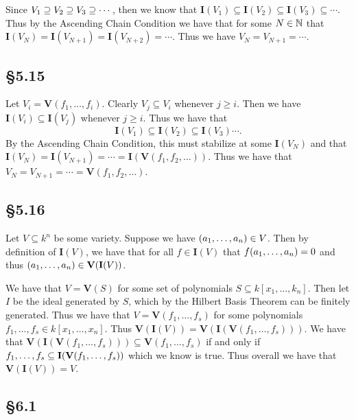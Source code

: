 \documentclass[letterpaper]{article}
\begin{document}
Since $V_{1} \supseteq V_{2} \supseteq V_{3} \supseteq \cdots$, then we know that $\mathbf{I}(V_{1}) \subseteq \mathbf{I}(V_{2}) \subseteq \mathbf{I}(V_{3}) \subseteq \cdots$. Thus by the Ascending Chain Condition we have that for some $N \in \mathbb{N}$ that $\mathbf{I}(V_{N}) = \mathbf{I}(V_{N + 1}) = \mathbf{I}(V_{N + 2}) = \cdots$. Thus we have $V_{N} = V_{N + 1} = \cdots$.

\subsection*{\S 5.15}

Let $V_{i} = \textbf{V}(f_{1}, \ldots, f_{i})$. Clearly $V_{j} \subseteq V_{i}$ whenever $j \geq i$. Then we have $\mathbf{I}(V_{i}) \subseteq \mathbf{I}(V_{j})$ whenever $j \geq i$. Thus we have that
\[
  \mathbf{I}(V_{1}) \subseteq \mathbf{I}(V_{2}) \subseteq \mathbf{I}(V_{3}) \cdots.
\]
By the Ascending Chain Condition, this must stabilize at some $\mathbf{I}(V_{N})$ and that $\mathbf{I}(V_{N}) = \mathbf{I}(V_{N + 1}) = \cdots = \mathbf{I}(\textbf{V}(f_{1}, f_{2}, \ldots))$. Thus we have that $V_{N} = V_{N + 1} = \cdots = \textbf{V}(f_{1}, f_{2}, \ldots)$.

\subsection*{\S 5.16}

Let $V \subseteq k^{n}$ be some variety. Suppose we have $\pqty{a_{1}, \ldots, a_{n}} \in V$. Then by definition of $\mathbf{I}(V)$, we have that for all $f \in \mathbf{I}(V)$ that $f\pqty{a_{1}, \ldots, a_{n}} = 0$ and thus $\pqty{a_{1}, \ldots, a_{n}} \in \textbf{V}(\mathbf{I}(V))$.

We have that $V = \textbf{V}(S)$ for some set of polynomials $S \subseteq k[x_{1}, \ldots, k_{n}]$. Then let $I$ be the ideal generated by $S$, which by the Hilbert Basis Theorem can be finitely generated. Thus we have that $V = \textbf{V}(f_{1}, \ldots, f_{s})$ for some polynomials $f_{1}, \ldots, f_{s} \in k[x_{1}, \ldots, x_{n}]$. Thus $\textbf{V}(\mathbf{I}(V)) = \textbf{V}(\mathbf{I}(\textbf{V}(f_{1}, \ldots, f_{s})))$. We have that $\textbf{V}(\mathbf{I}(\textbf{V}(f_{1}, \ldots, f_{s}))) \subseteq \textbf{V}(f_{1}, \ldots, f_{s})$ if and only if $\gen{f_{1}, \ldots, f_{s}} \subseteq \mathbf{I}(\textbf{V}(f_{1}, \ldots, f_{s}))$ which we know is true. Thus overall we have that $\textbf{V}(\mathbf{I}(V)) = V$.

\subsection*{\S 6.1}
\end{document}
